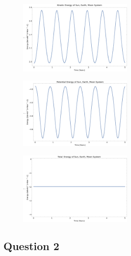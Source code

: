 \documentclass{article}
\begin{document}
\begin{figure}[!htb]
	\begin{center}
		\includegraphics[width=0.5\textwidth]{p1-4d.pdf}
	\end{center}
	\caption{}
\label{fig:qual}
\end{figure}
\FloatBarrier


\begin{figure}[!htb]
	\begin{center}
		\includegraphics[width=0.5\textwidth]{p1-4e.pdf}
	\end{center}
	\caption{}
\label{fig:qual}
\end{figure}
\FloatBarrier

\begin{figure}[!htb]
	\begin{center}
		\includegraphics[width=0.5\textwidth]{p1-4f.pdf}
	\end{center}
	\caption{}
\label{fig:qual}
\end{figure}
\FloatBarrier

\subsection{Question 2}
\end{document}
